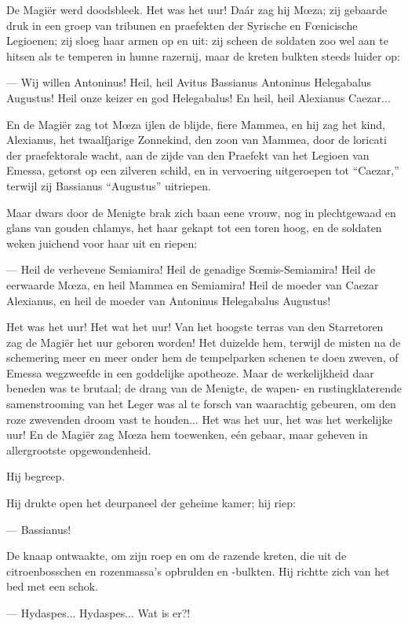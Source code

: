 \documentclass[a4paper, 12pt, oneside, dutch]{article}
\begin{document}
De Magiër werd doodsbleek. Het was het uur! Daár zag hij Mœza; zij gebaarde druk in een groep van tribunen en praefekten der Syrische en Fœnicische Legioenen; zij sloeg haar armen op en uit: zij scheen de soldaten zoo wel aan te hitsen als te temperen in hunne razernij, maar de kreten bulkten steeds luider op:

--- Wij willen Antoninus! Heil, heil Avitus Bassianus Antoninus Helegabalus Augustus! Heil onze keizer en god Helegabalus! En heil, heil Alexianus Caezar...

En de Magiër zag tot Mœza ijlen de blijde, fiere Mammea, en hij zag het kind, Alexianus, het twaalfjarige Zonnekind, den zoon van Mammea, door de loricati der praefektorale wacht, aan de zijde van den Praefekt van het Legioen van Emessa, getorst op een zilveren schild, en in vervoering uitgeroepen tot "`Caezar,"' terwijl zij Bassianus "`Augustus"' uitriepen.

Maar dwars door de Menigte brak zich baan eene vrouw, nog in plechtgewaad en glans van gouden chlamys, het haar gekapt tot een toren hoog, en de soldaten weken juichend voor haar uit en riepen:

--- Heil de verhevene Semiamira! Heil de genadige Sœmis-Semiamira! Heil de eerwaarde Mœza, en heil Mammea en Semiamira! Heil de moeder van Caezar Alexianus, en heil de moeder van Antoninus Helegabalus Augustus!

Het was het uur! Het wat het uur! Van het hoogste terras van den Starretoren zag de Magiër het uur geboren worden! Het duizelde hem, terwijl de misten na de schemering meer en meer onder hem de tempelparken schenen te doen zweven, of Emessa wegzweefde in een goddelijke apotheoze. Maar de werkelijkheid daar beneden was te brutaal; de drang van de Menigte, de wapen- en rustingklaterende samenstrooming van het Leger was al te forsch van waarachtig gebeuren, om den roze zwevenden droom vast te houden... Het was het uur, het was het werkelijke uur! En de Magiër zag Mœza hem toewenken, eén gebaar, maar geheven in allergrootste opgewondenheid.

Hij begreep.

Hij drukte open het deurpaneel der geheime kamer; hij riep:

--- Bassianus!

De knaap ontwaakte, om zijn roep en om de razende kreten, die uit de citroenbosschen en rozenmassa's opbrulden en -bulkten. Hij richtte zich van het bed met een schok.

--- Hydaspes... Hydaspes... Wat is er?!
\end{document}
